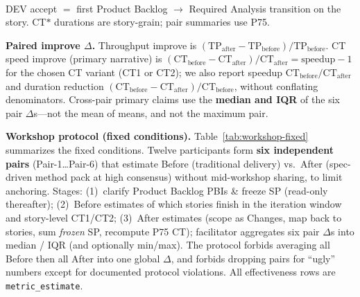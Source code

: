 \documentclass[10pt,conference]{IEEEtran}
\begin{document}
\begin{table}[!t]
\centering
\caption{Cycle Time (CT) variants used in the workshop.}
\label{tab:ct-variants}
\footnotesize
\setlength{\tabcolsep}{2pt}
\\[0.3em]
{\scriptsize DEV accept $=$ first Product Backlog $\rightarrow$ Required Analysis transition on the story. CT$*$ durations are story-grain; pair summaries use P75.}
\end{table}

\textbf{Paired improve $\Delta$.}
Throughput improve is $(\mathrm{TP_{after}}-\mathrm{TP_{before}})/\mathrm{TP_{before}}$.
CT speed improve (primary narrative) is $(\mathrm{CT_{before}}-\mathrm{CT_{after}})/\mathrm{CT_{after}}=\mathrm{speedup}-1$ for the chosen CT variant (CT1 or CT2); we also report speedup $\mathrm{CT_{before}}/\mathrm{CT_{after}}$ and duration reduction $(\mathrm{CT_{before}}-\mathrm{CT_{after}})/\mathrm{CT_{before}}$, without conflating denominators.
Cross-pair primary claims use the \textbf{median and IQR} of the six pair $\Delta$s---not the mean of means, and not the maximum pair.

\textbf{Workshop protocol (fixed conditions).}
Table~\ref{tab:workshop-fixed} summarizes the fixed conditions.
Twelve participants form \textbf{six independent pairs} (Pair-1\ldots Pair-6) that estimate Before (traditional delivery) vs.\ After (spec-driven method pack at high consensus) without mid-workshop sharing, to limit anchoring.
Stages: (1)~clarify Product Backlog PBIs \& freeze SP (read-only thereafter); (2)~Before estimates of which stories finish in the iteration window and story-level CT1/CT2; (3)~After estimates (scope as Changes, map back to stories, sum \emph{frozen} SP, recompute P75 CT); facilitator aggregates six pair $\Delta$s into median / IQR (and optionally min/max).
The protocol forbids averaging all Before then all After into one global $\Delta$, and forbids dropping pairs for ``ugly'' numbers except for documented protocol violations.
All effectiveness rows are \texttt{metric\_estimate}.
\end{document}

